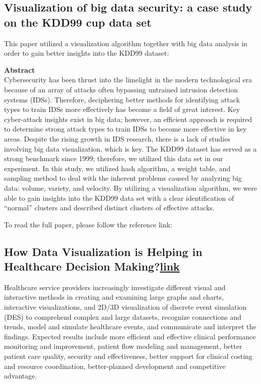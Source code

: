 \documentclass[]{book}
\theoremstyle{definition}
\theoremstyle{definition}
\theoremstyle{definition}
\theoremstyle{remark}
\begin{document}
\subsection{Visualization of big data security: a case study on the
KDD99 cup data
set}\label{visualization-of-big-data-security-a-case-study-on-the-kdd99-cup-data-set}

This paper utilized a visualization algorithm together with big data
analysis in order to gain better insights into the KDD99 dataset:

\textbf{Abstract}\\
Cybersecurity has been thrust into the limelight in the modern
technological era because of an array of attacks often bypassing
untrained intrusion detection systems (IDSs). Therefore, deciphering
better methods for identifying attack types to train IDSs more
effectively has become a field of great interest. Key cyber-attack
insights exist in big data; however, an efficient approach is required
to determine strong attack types to train IDSs to become more effective
in key areas. Despite the rising growth in IDS research, there is a lack
of studies involving big data visualization, which is key. The KDD99
dataset has served as a strong benchmark since 1999; therefore, we
utilized this data set in our experiment. In this study, we utilized
hash algorithm, a weight table, and sampling method to deal with the
inherent problems caused by analyzing big data: volume, variety, and
velocity. By utilizing a visualization algorithm, we were able to gain
insights into the KDD99 data set with a clear identification of
``normal'' clusters and described distinct clusters of effective
attacks.

To read the full paper, please follow the reference link: \citep{KDD99}

\subsection{\texorpdfstring{How Data Visualization is Helping in
Healthcare Decision
Making?\href{https://marksmanhealthcare.com/data-visualization-helping-healthcare-decision-making/}{link}}{How Data Visualization is Helping in Healthcare Decision Making?link}}\label{how-data-visualization-is-helping-in-healthcare-decision-makinglink}

Healthcare service providers increasingly investigate different visual
and interactive methods in creating and examining large graphs and
charts, interactive visualizations, and 2D/3D visualization of discrete
event simulation (DES) to comprehend complex and large datasets,
recognize connections and trends, model and simulate healthcare events,
and communicate and interpret the findings. Expected results include
more efficient and effective clinical performance monitoring and
improvement, patient flow modeling and management, better patient care
quality, security and effectiveness, better support for clinical costing
and resource coordination, better-planned development and competitive
advantage.
\end{document}
